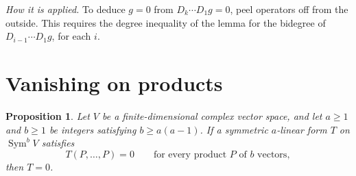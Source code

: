 \documentclass[11pt]{article}
\newtheorem{proposition}[theorem]{Proposition}
\theoremstyle{remark}
\DeclareMathOperator{\Sym}{Sym}
\begin{document}
\emph{How it is applied.} To deduce $g=0$ from $D_k\cdots D_1g=0$, peel
operators off from the outside. This requires the degree inequality of the
lemma for the bidegree of $D_{i-1}\cdots D_1g$, for each $i$.

\section{Vanishing on products}\label{sec:vanishing}

\begin{proposition}\label{prop:vanishing}
Let $V$ be a finite-dimensional complex vector space, and let $a\ge1$ and
$b\ge1$ be integers satisfying $b\ge a(a-1)$.
If a symmetric $a$-linear form $T$ on $\Sym^b V$ satisfies
\begin{equation}\label{eq:diagonal}
 T(P,\ldots,P)=0
 \qquad\text{for every product $P$ of $b$ vectors},
\end{equation}
then $T=0$.
\end{proposition}
\end{document}
